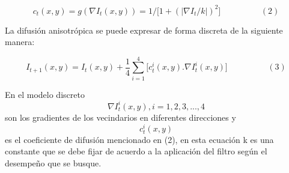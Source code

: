 \begin{displaymath}
c_t(x,y)=g(\nabla I_t(x,y))=1/\lbrack1+(\left|\nabla I_t/k\right|)^2\rbrack \hspace{2cm}(2)
\end{displaymath}

La difusión anisotrópica  se puede expresar de forma discreta de la siguiente manera:

\begin{displaymath}
I_{t+1}(x,y)=I_t(x,y) + \frac14{{{\sum_{i=1}^{4} \lbrack c_t^i(x,y).\nabla I_t^i(x,y)\rbrack}}} \hspace{2cm}(3)
\end{displaymath}

En el modelo discreto \begin{displaymath} \nabla I_t^i(x,y), i= 1,2,3,...,4 \end{displaymath} son los gradientes de los vecindarios en diferentes direcciones y \begin{displaymath} c_t^i(x,y) \end{displaymath} es el coeficiente de difusi\'on mencionado en (2), en esta ecuaci\'on k es una constante que se debe fijar de acuerdo a la aplicaci\'on del filtro seg\'un el desempe\~no que se busque.\\

